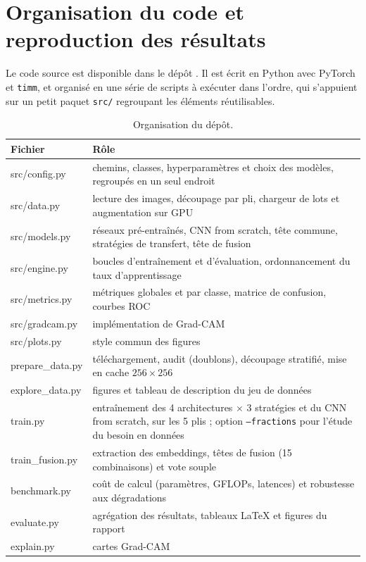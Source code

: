 \section{Organisation du code et reproduction des résultats}
\label{sec:annexe}

Le code source est disponible dans le dépôt \depot. Il est écrit en Python avec PyTorch et \texttt{timm}, et organisé en une série de scripts à exécuter dans l'ordre, qui s'appuient sur un petit paquet \texttt{src/} regroupant les éléments réutilisables.

\begin{table}[htbp]
\centering
\caption{Organisation du dépôt.}
\label{tab:repo}
\begin{tabularx}{\textwidth}{>{\ttfamily}l X}
\toprule
\textrm{\textbf{Fichier}} & \textbf{Rôle} \\
\midrule
src/config.py & chemins, classes, hyperparamètres et choix des modèles, regroupés en un seul endroit \\
src/data.py & lecture des images, découpage par pli, chargeur de lots et augmentation sur GPU \\
src/models.py & réseaux pré-entraînés, CNN from scratch, tête commune, stratégies de transfert, tête de fusion \\
src/engine.py & boucles d'entraînement et d'évaluation, ordonnancement du taux d'apprentissage \\
src/metrics.py & métriques globales et par classe, matrice de confusion, courbes ROC \\
src/gradcam.py & implémentation de Grad-CAM \\
src/plots.py & style commun des figures \\
\midrule
prepare\_data.py & téléchargement, audit (doublons), découpage stratifié, mise en cache $256\times256$ \\
explore\_data.py & figures et tableau de description du jeu de données \\
train.py & entraînement des 4 architectures $\times$ 3 stratégies et du CNN from scratch, sur les 5 plis ; option \texttt{--fractions} pour l'étude du besoin en données \\
train\_fusion.py & extraction des embeddings, têtes de fusion (15 combinaisons) et vote souple \\
benchmark.py & coût de calcul (paramètres, GFLOPs, latences) et robustesse aux dégradations \\
evaluate.py & agrégation des résultats, tableaux \LaTeX{} et figures du rapport \\
explain.py & cartes Grad-CAM \\
\bottomrule
\end{tabularx}
\end{table}

